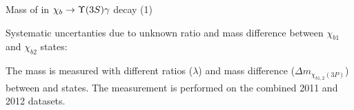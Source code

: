\begin{frame}{Mass of \chiboneThreeP in $\chib \to \Y3S \gamma$ decay (1)}
\setlength{\unitlength}{1mm}
\centering

Systematic uncertanties due to unknown ratio and mass difference between $\chi_{b1}$ and $\chi_{b2}$ states:

\begin{block}{}
\scriptsize
The mass is measured with different ratios ($\lambda$) and mass difference 
($\Delta{m_{\chi_{b1,2}(3P)}}$) between \chiboneThreeP and \chibtwoThreeP states.
The measurement is performed on the combined 2011 and 2012 datasets.
\end{block}



\end{frame}